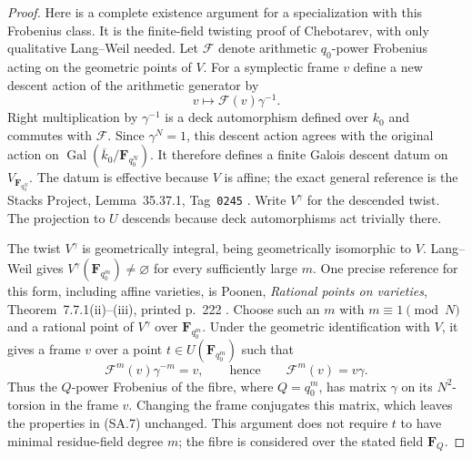 \begin{proof}
Here is a complete existence argument for a specialization
with this Frobenius class.  It is the finite-field
twisting proof of Chebotarev, with only qualitative
Lang--Weil needed.  Let $\mathcal F$ denote arithmetic
$q_0$-power Frobenius acting on the geometric points of
$V$.  For a symplectic frame $v$ define a new descent
action of the arithmetic generator by
\[
                       v\longmapsto
                               \mathcal F(v)\gamma^{-1}.
                                                               \tag{SA.8}
\]
Right multiplication by $\gamma^{-1}$ is a deck
automorphism defined over $k_0$ and commutes with
$\mathcal F$.  Since $\gamma^N=1$, this descent action
agrees with the original action on
$\operatorname{Gal}(\overline{k}_0/\mathbf F_{q_0^N})$.
It therefore defines a finite Galois descent datum on
$V_{\mathbf F_{q_0^N}}$.  The datum is effective because
$V$ is affine; the exact general reference is the
Stacks Project, Lemma~35.37.1, Tag~\texttt{0245}
\cite{Stacks0245}.
Write $V^\gamma$ for the descended twist.
The projection to $U$ descends because deck
automorphisms act trivially there.

The twist $V^\gamma$ is geometrically integral, being
geometrically isomorphic to $V$.  Lang--Weil gives
$V^\gamma(\mathbf F_{q_0^m})\ne\varnothing$ for every
sufficiently large $m$.  One precise reference for this
form, including affine varieties, is Poonen,
\emph{Rational points on varieties}, Theorem~7.7.1(ii)--(iii),
printed p.~222 \cite{Poonen2017RPV}.  Choose such an $m$
with $m\equiv1\pmod N$ and a rational point of
$V^\gamma$ over $\mathbf F_{q_0^m}$.  Under the geometric
identification with $V$, it gives a frame $v$ over a
point $t\in U(\mathbf F_{q_0^m})$ such that
\[
                \mathcal F^m(v)\gamma^{-m}=v,
       \qquad\text{hence}\qquad
                \mathcal F^m(v)=v\gamma.                      \tag{SA.9}
\]
Thus the $Q$-power Frobenius of the fibre, where
$Q=q_0^m$, has matrix $\gamma$ on its $N^2$-torsion in
the frame $v$.  Changing the frame conjugates this
matrix, which leaves the properties in (SA.7) unchanged.
This argument does not require $t$ to have minimal
residue-field degree $m$; the fibre is considered over
the stated field $\mathbf F_Q$.


\end{proof}
